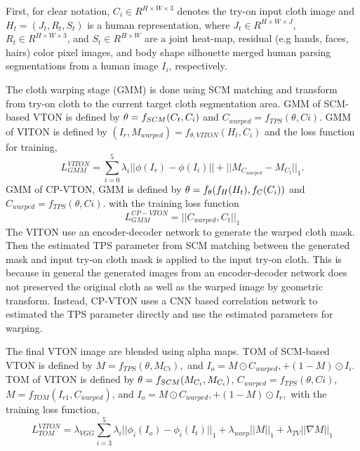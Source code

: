 First, for clear notation, $C_i \in R^{H \times W \times3} $ denotes the try-on input cloth image 
and $ H_t = (J_t, R_t, S_t)$ is a human representation, 
where $ J_t \in R^{H \times W \times J}$, $R_t \in R^{H \times W \times 3}$, and $ S_t \in R^{H \times W}$ are a joint heat-map, residual (e.g hands, faces, hairs) color pixel images, and body shape silhouette merged human parsing segmentations from a human image $I_i$, respectively.    

The cloth warping stage (GMM) is done using SCM matching and transform from try-on cloth to the current target cloth segmentation area. 
GMM of SCM-based VTON is defined by  
$
   \bold{\theta} = f_{SCM} (C_t, C_i)
$
and
$
   C_{warped} = f_{TPS}(\theta, Ci)
$.    
GMM of VITON is defined by 
$
   (I_{r}, M_{warped}) = f_{\theta, VITON} (H_t, C_i) 
$
and the loss function for training, 
\begin{equation}
   L_{GMM}^{VITON} =   \sum_{i=0}^{5} \lambda_i || \phi (I_r) - \phi (I_i)||  + 
   ||M_{C_{warped}} -  M_{C_t}||_1 .
\end{equation}
GMM of CP-VTON, GMM is defined by 
$  
   \bold{\theta} = f_{\theta} ( f_H (H_t), f_C(C_i) )
$
and
$
   C_{warped} = f_{TPS}(\theta, Ci).
$    
with the training loss function
\begin{equation}
   L_{GMM}^{CP-VTON} =  ||C_{warped}, C_t||_1
\end{equation}
The VITON use an encoder-decoder network to generate the warped cloth mask. Then the estimated TPS parameter from SCM matching between the generated mask and input try-on cloth mask is applied to the input try-on cloth. This is because in general the generated images from an encoder-decoder network does not preserved the original cloth as well as the warped image by geometric transform. Instead, CP-VTON uses a CNN based correlation network to estimated the TPS parameter directly and use the estimated parameters for warping.   



The final VTON image are blended using alpha maps.
TOM  of SCM-based VTON  is defined by 
$
   M = f_{TPS}(\theta, M_{Ci}),
$    
and 
$
   I_o = M \odot C_{warped}, + (1-M) \odot I_i 
$.
TOM of VITON is defined by 
$
   \bold{\theta} = f_{SCM} (M_{C_t}, M_{C_i})
$,
$
   C_{warped} = f_{TPS}(\theta, Ci)
$,    
$
 M = f_{TOM} ( I_{r1}, C_{warped} ) 
$, 
and 
$
   I_o = M \odot C_{warped}, + (1-M) \odot I_{r},
$
with the training loss function, 
\begin{equation}
   L_{TOM}^{VITON} = \lambda_{VGG} \sum_{i=3}^{5} \lambda_i || \phi_i(I_o) - \phi_i(I_t)||_{1}  + 
             \lambda_{warp}  || M ||_{1}  + 
             \lambda_{TV} || \nabla M||_{1}      
\end{equation}

